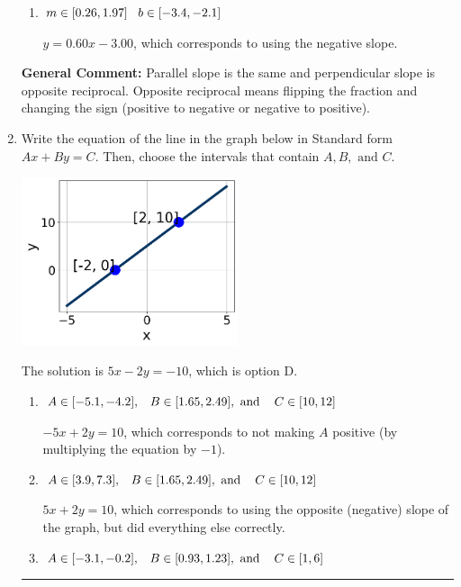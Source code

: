 \documentclass{extbook}[14pt]
\newcommand{\litem}[1]{\item #1

\rule{\textwidth}{0.4pt}}
\begin{document}
\begin{enumerate}
{\begin{enumerate}[label=\Alph*.]
 $y = -1.67x + 9.00$, which corresponds to using the reciprocal slope $(1/m)$.
\item \( m \in [0.26, 1.97] \hspace*{3mm} b \in [-3.4, -2.1] \)

 $y = 0.60x - 3.00$, which corresponds to using the negative slope.
\end{enumerate}

\textbf{General Comment:} Parallel slope is the same and perpendicular slope is opposite reciprocal. Opposite reciprocal means flipping the fraction and changing the sign (positive to negative or negative to positive).
}
\litem{
Write the equation of the line in the graph below in Standard form $Ax+By=C$. Then, choose the intervals that contain $A, B, \text{ and } C$.

\begin{center}
    \includegraphics[width=0.5\textwidth]{../Figures/linearGraphToStandardCopyA.png}
\end{center}


The solution is \( 5x - 2y = -10 \), which is option D.\begin{enumerate}[label=\Alph*.]
\item \( A \in [-5.1, -4.2], \hspace{3mm} B \in [1.65, 2.49], \text{ and } \hspace{3mm} C \in [10, 12] \)

 $-5x + 2y = 10$, which corresponds to not making $A$ positive (by multiplying the equation by $-1$).
\item \( A \in [3.9, 7.3], \hspace{3mm} B \in [1.65, 2.49], \text{ and } \hspace{3mm} C \in [10, 12] \)

 $5x + 2y = 10$, which corresponds to using the opposite (negative) slope of the graph, but did everything else correctly.
\item \( A \in [-3.1, -0.2], \hspace{3mm} B \in [0.93, 1.23], \text{ and } \hspace{3mm} C \in [1, 6] \)


\end{enumerate}}
\end{enumerate}
\end{document}

